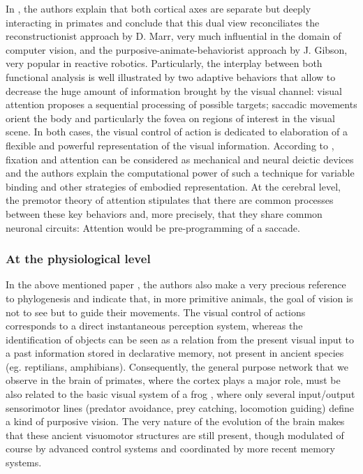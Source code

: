 In \cite{Goodale:1998}, the authors explain that both cortical axes
are separate but deeply interacting in primates and conclude that this
dual view reconciliates the reconstructionist approach by D. Marr, very
much influential in the domain of computer vision, and the
purposive-animate-behaviorist approach by J. Gibson, very popular in
reactive robotics.  Particularly, the interplay between both
functional analysis is well illustrated by two adaptive behaviors that
allow to decrease the huge amount of information brought by the visual
channel: visual attention proposes a sequential processing of possible
targets; saccadic movements orient the body and particularly the fovea
on regions of interest in the visual scene. In both cases, the visual
control of action is dedicated to elaboration of a flexible and
powerful representation of the visual information. According to
\cite{Ballard:1997}, fixation and attention can be considered as
mechanical and neural deictic devices and the authors explain the
computational power of such a technique for variable binding and other
strategies of embodied representation. At the cerebral level, the
premotor theory of attention \cite{Rizzolatti:1987} stipulates that
there are common processes between these key behaviors and, more
precisely, that they share common neuronal circuits: Attention would
be pre-programming of a saccade.

\subsubsection{At the physiological level}

In the above mentioned paper \cite{Goodale:1998}, the authors also
make a very precious reference to phylogenesis and indicate that, in
more primitive animals, the goal of vision is not to see but to guide
their movements. The visual control of actions corresponds to a direct
instantaneous perception system, whereas the identification of objects
can be seen as a relation from the present visual input to a past
information stored in declarative memory, not present in ancient
species (eg. reptilians, amphibians). Consequently, the general
purpose network that we observe in the brain of primates, where the
cortex plays a major role, must be also related to the basic visual
system of a frog \cite{Lettvin:1968}, where only several input/output
sensorimotor lines (predator avoidance, prey catching, locomotion
guiding) define a kind of purposive vision. The very nature of the
evolution of the brain makes that these ancient visuomotor structures
are still present, though modulated of course by advanced control
systems and coordinated by more recent memory systems.

